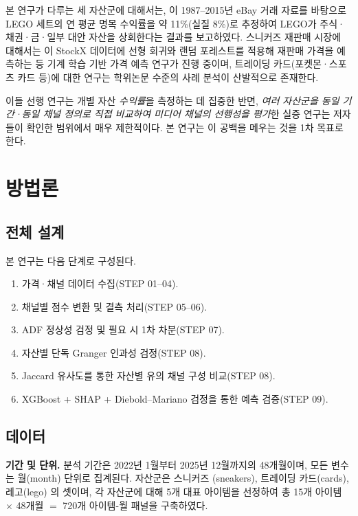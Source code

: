\documentclass[11pt, a4paper, twocolumn]{article}
\begin{document}
본 연구가 다루는 세 자산군에 대해서는,
\citet{dobrynskayakishilova2022}이 1987--2015년 eBay 거래 자료를 바탕으로
LEGO 세트의 연 평균 명목 수익률을 약 11\%(실질 8\%)로 추정하여 LEGO가
주식·채권·금·일부 대안 자산을 상회한다는 결과를 보고하였다. 스니커즈
재판매 시장에 대해서는 \citet{radityaetal2021}이 StockX 데이터에
선형 회귀와 랜덤 포레스트를 적용해 재판매 가격을 예측하는 등 기계
학습 기반 가격 예측 연구가 진행 중이며, 트레이딩 카드(포켓몬·스포츠
카드 등)에 대한 연구는 학위논문 수준의 사례 분석이 산발적으로 존재한다.

이들 선행 연구는 개별 자산 \emph{수익률}을 측정하는 데 집중한 반면,
\emph{여러 자산군을 동일 기간·동일 채널 정의로 직접 비교하여 미디어
채널의 선행성을 평가}한 실증 연구는 저자들이 확인한 범위에서 매우
제한적이다. 본 연구는 이 공백을 메우는 것을 1차 목표로 한다.

\section{방법론}\label{sec:method}

\subsection{전체 설계}\label{sec:method-design}

본 연구는 다음 단계로 구성된다.

\begin{enumerate}[leftmargin=1.6em]
  \item 가격·채널 데이터 수집(STEP 01--04).
  \item 채널별 점수 변환 및 결측 처리(STEP 05--06).
  \item ADF 정상성 검정 및 필요 시 1차 차분(STEP 07).
  \item 자산별 단독 Granger 인과성 검정(STEP 08).
  \item Jaccard 유사도를 통한 자산별 유의 채널 구성 비교(STEP 08).
  \item XGBoost + SHAP + Diebold--Mariano 검정을 통한 예측 검증(STEP 09).
\end{enumerate}

\subsection{데이터}\label{sec:method-data}

\textbf{기간 및 단위.} 분석 기간은 2022년 1월부터 2025년 12월까지의
48개월이며, 모든 변수는 월(month) 단위로 집계된다. 자산군은 스니커즈
(\textsf{sneakers}), 트레이딩 카드(\textsf{cards}), 레고(\textsf{lego})
의 셋이며, 각 자산군에 대해 5개 대표 아이템을 선정하여 총 15개 아이템
$\times$ 48개월 $=$ 720개 아이템-월 패널을 구축하였다.
\end{document}
